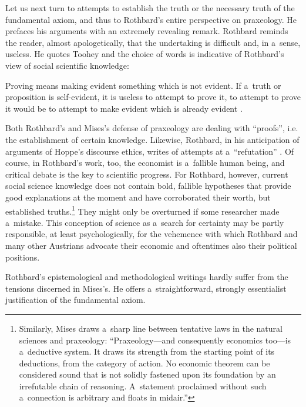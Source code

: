 Let us next turn to attempts to establish the truth or the necessary truth of the fundamental axiom, and thus to Rothbard's entire perspective on praxeology. He prefaces his arguments with an extremely revealing remark. Rothbard reminds the reader, almost apologetically, that the undertaking is difficult and, in a~sense, useless. He quotes Toohey and the choice of words is indicative of Rothbard's view of social scientific knowledge:



Proving means making evident something which is not evident. If a~truth or proposition is self-evident, it is useless to attempt to prove it, to attempt to prove it would be to attempt to make evident which is already evident 
\parencite[][p.28]{rothbard_praxeology:_1976}.%




Both Rothbard's and Mises's defense of praxeology are dealing with ``proofs'', i.e. the establishment of certain knowledge. Likewise, Rothbard, in his anticipation of arguments of Hoppe's discourse ethics, writes of attempts at a~``refutation'' 
\parencite[][pp.28–29]{rothbard_praxeology:_1976}. %
 Of course, in Rothbard's work, too, the economist is a~fallible human being, and critical debate is the key to scientific progress. For Rothbard, however, current social science knowledge does not contain bold, fallible hypotheses that provide good explanations at the moment and have corroborated their worth, but established truths.\footnote{Similarly, Mises 
\parencite*[][p.68]{mises_human_1998} %
 draws a~sharp line between tentative laws in the natural sciences and praxeology: ``Praxeology---and consequently economics too---is a~deductive system. It draws its strength from the starting point of its deductions, from the category of action. No economic theorem can be considered sound that is not solidly fastened upon its foundation by an irrefutable chain of reasoning. A~statement proclaimed without such a~connection is arbitrary and floats in midair.''} They might only be overturned if some researcher made a~mistake. This conception of science as a~search for certainty may be partly responsible, at least psychologically, for the vehemence with which Rothbard and many other Austrians advocate their economic and oftentimes also their political positions.



Rothbard's epistemological and methodological writings hardly suffer from the tensions discerned in Mises's. He offers a~straightforward, strongly essentialist justification of the fundamental axiom.



